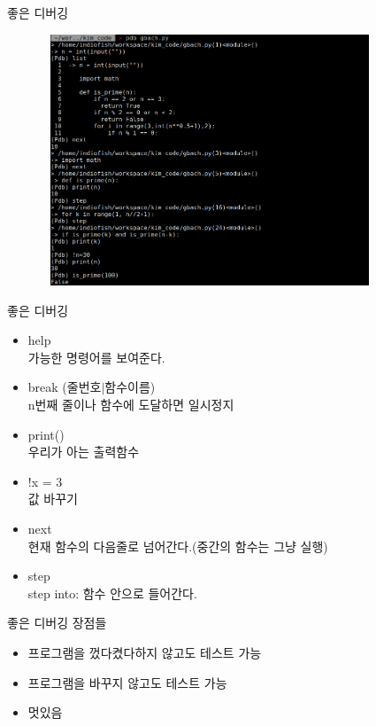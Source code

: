 \documentclass{beamer}
\begin{document}
\begin{frame}[fragile]{좋은 디버깅}
\begin{figure}[H]
  \centering
  \includegraphics[width=100mm,height=75mm]{pdb_usage.png}
\end{figure}
\end{frame}

\begin{frame}{좋은 디버깅}
\begin{itemize}
  \item help\\
    가능한 명령어를 보여준다.
  \item break (줄번호$\vert$함수이름)\\
    n번째 줄이나 함수에 도달하면 일시정지
  \item print()\\
    우리가 아는 출력함수
  \item !x = 3\\
    값 바꾸기
  \item next\\
    현재 함수의 다음줄로 넘어간다.(중간의 함수는 그냥 실행)
  \item step\\
    step into: 함수 안으로 들어간다.
\end{itemize}
\end{frame}

\begin{frame}{좋은 디버깅}
장점들
\begin{itemize}
  \item 프로그램을 껐다켰다하지 않고도 테스트 가능
  \item 프로그램을 바꾸지 않고도 테스트 가능
  \item 멋있음
\end{itemize}
\end{frame}
\end{document}
